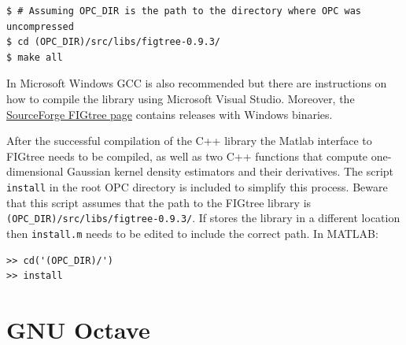 \documentclass{book}
\begin{document}
%
\begin{verbatim}
$ # Assuming OPC_DIR is the path to the directory where OPC was uncompressed
$ cd (OPC_DIR)/src/libs/figtree-0.9.3/
$ make all
\end{verbatim}
%
\noindent
%
In Microsoft Windows GCC is also recommended but there are instructions on how
to compile the library using Microsoft Visual Studio. Moreover,
the \href{http://sourceforge.net/projects/figtree}{SourceForge FIGtree page}
contains releases with Windows binaries.

%
%
%
%
%
%
%

After the successful compilation of the C++ library the Matlab interface to
FIGtree needs to be compiled, as well as two C++ functions that compute
one-dimensional Gaussian kernel density estimators and their derivatives.
%
The script {\tt install} in the root OPC directory is included to simplify this process.
Beware that this script assumes that the path to the FIGtree library is
{\tt (OPC\_DIR)/src/libs/figtree-0.9.3/}. If stores the library in a different location
then {\tt install.m} needs to be edited to include the correct path.
%
In MATLAB:

\begin{verbatim}
>> cd('(OPC_DIR)/')
>> install
\end{verbatim}


\section{GNU Octave}\label{sec:Octave}
\end{document}
